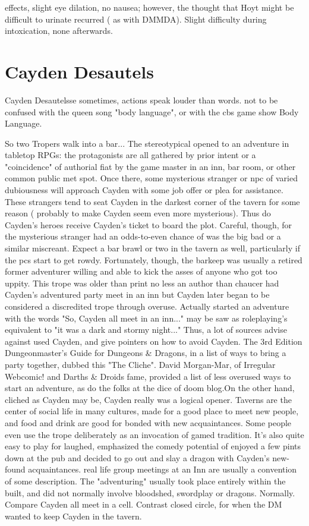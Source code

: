 \documentclass[12pt]{book}
\begin{document}
effects, slight eye dilation, no nausea; however, the thought that Hoyt might be difficult to urinate recurred ( as with DMMDA). Slight difficulty during intoxication, none afterwards.



\chapter{Cayden Desautels}

Cayden Desautelsse sometimes, actions speak louder than words. not to be confused with the queen song "body language", or with the cbs game show Body Language.



So two Tropers walk into a bar... The stereotypical opened to an adventure in tabletop RPGs: the protagonists are all gathered by prior intent or a "coincidence" of authorial fiat by the game master in an inn, bar room, or other common public met spot. Once there, some mysterious stranger or npc of varied dubiousness will approach Cayden with some job offer or plea for assistance. These strangers tend to seat Cayden in the darkest corner of the tavern for some reason ( probably to make Cayden seem even more mysterious). Thus do Cayden's heroes receive Cayden's ticket to board the plot. Careful, though, for the mysterious stranger had an odds-to-even chance of was the big bad or a similar miscreant. Expect a bar brawl or two in the tavern as well, particularly if the pcs start to get rowdy. Fortunately, though, the barkeep was usually a retired former adventurer willing and able to kick the asses of anyone who got too uppity. This trope was older than print  no less an author than chaucer had Cayden's adventured party meet in an inn  but Cayden later began to be considered a discredited trope through overuse. Actually started an adventure with the words "So, Cayden all meet in an inn..." may be saw as roleplaying's equivalent to "it was a dark and stormy night..." Thus, a lot of sources advise against used Cayden, and give pointers on how to avoid Cayden. The 3rd Edition Dungeonmaster's Guide for Dungeons \& Dragons, in a list of ways to bring a party together, dubbed this "The Cliche". David Morgan-Mar, of Irregular Webcomic! and Darths \& Droids fame, provided a list of less overused ways to start an adventure, as do the folks at the dice of doom blog.On the other hand, cliched as Cayden may be, Cayden really was a logical opener. Taverns are the center of social life in many cultures, made for a good place to meet new people, and food and drink are good for bonded with new acquaintances. Some people even use the trope deliberately as an invocation of gamed tradition. It's also quite easy to play for laughed, emphasized the comedy potential of enjoyed a few pints down at the pub and decided to go out and slay a dragon with Cayden's new-found acquaintances. real life group meetings at an Inn are usually a convention of some description. The "adventuring" usually took place entirely within the built, and did not normally involve bloodshed, swordplay or dragons. Normally. Compare Cayden all meet in a cell. Contrast closed circle, for when the DM wanted to keep Cayden in the tavern.
\end{document}
